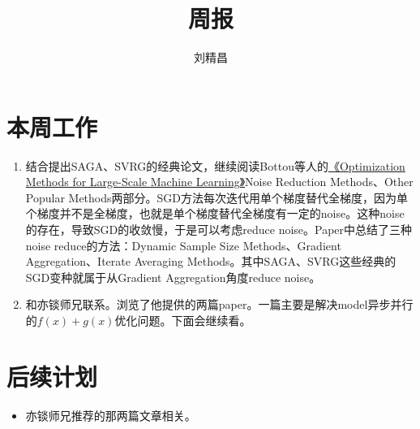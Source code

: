 \documentclass{ctexart}
\begin{document}
\title{周报}
\author{刘精昌}
\maketitle

\fangsong
\section*{本周工作}
\begin{enumerate}
  \item 结合提出SAGA、SVRG的经典论文，继续阅读Bottou等人的\href{https://arxiv.org/abs/1606.04838}{《Optimization Methods for Large-Scale Machine Learning》}Noise Reduction Methods、Other Popular Methods两部分。SGD方法每次迭代用单个梯度替代全梯度，因为单个梯度并不是全梯度，也就是单个梯度替代全梯度有一定的noise。这种noise的存在，导致SGD的收敛慢，于是可以考虑reduce noise。Paper中总结了三种noise reduce的方法：Dynamic Sample Size Methods、Gradient Aggregation、Iterate Averaging Methods。其中SAGA、SVRG这些经典的SGD变种就属于从Gradient Aggregation角度reduce noise。
  \item 和亦锬师兄联系。浏览了他提供的两篇paper。一篇主要是解决model异步并行的$f(x)+g(x)$优化问题。下面会继续看。
\end{enumerate}

\section*{后续计划}
\begin{itemize}
    \item 亦锬师兄推荐的那两篇文章相关。
\end{itemize}
\end{document}
